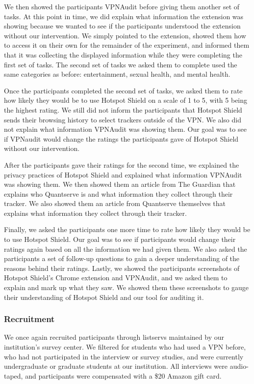 We then showed the participants VPNAudit before giving them another set of tasks.
At this point in time, we did explain what information the extension was showing because we wanted to see if the participants understood the extension without our intervention.
We simply pointed to the extension, showed them how to access it on their own for the remainder of the experiment, and informed them that it was collecting the displayed information while they were completing the first set of tasks.
The second set of tasks we asked them to complete used the same categories as before: entertainment, sexual health, and mental health.

Once the participants completed the second set of tasks, we asked them to rate how likely they would be to use Hotspot Shield on a scale of 1 to 5, with 5 being the highest rating.
We still did not inform the participants that Hotspot Shield sends their browsing history to select trackers outside of the VPN.
We also did not explain what information VPNAudit was showing them.
Our goal was to see if VPNaudit would change the ratings the participants gave of Hotspot Shield without our intervention.

After the participants gave their ratings for the second time, we explained the privacy practices of Hotspot Shield and explained what information VPNAudit was showing them.
We then showed them an article from The Guardian that explains who Quantserve is and what information they collect through their tracker.
We also showed them an article from Quantserve themselves that explains what information they collect through their tracker.

Finally, we asked the participants one more time to rate how likely they would be to use Hotspot Shield.
Our goal was to see if participants would change their ratings again based on all the information we had given them.
We also asked the participants a set of follow-up questions to gain a deeper understanding of the reasons behind their ratings.
Lastly, we showed the participants screenshots of Hotspot Shield's Chrome extension and VPNAudit, and we asked them to explain and mark up what they saw.
We showed them these screenshots to gauge their understanding of Hotspot Shield and our tool for auditing it.


\subsubsection{Recruitment} 
We once again recruited participants through listservs maintained by our institution's survey center.
We filtered for students who had used a VPN before, who had not participated in the interview or survey studies, and were currently undergraduate or graduate students at our institution. 
All interviews were audio-taped, and participants were compensated with a \$20 Amazon gift card.

